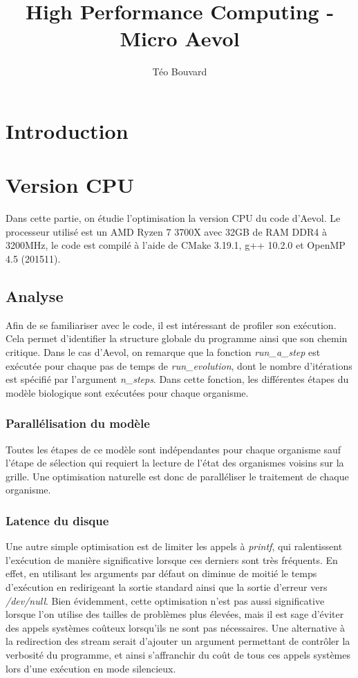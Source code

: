 \documentclass[a4paper, 10pt, twoside]{article}
\begin{document}
\title{High Performance Computing - Micro Aevol}
\author{T\'eo Bouvard}
\maketitle

\section{Introduction}

\section{Version CPU}

Dans cette partie, on étudie l'optimisation la version CPU du code d'Aevol. Le processeur utilisé est un AMD Ryzen 7 3700X avec 32GB de RAM DDR4 à 3200MHz, le code est compilé à l'aide de CMake 3.19.1, g++ 10.2.0 et OpenMP 4.5 (201511).

\subsection{Analyse}

Afin de se familiariser avec le code, il est intéressant de profiler son exécution. Cela permet d'identifier la structure globale du programme ainsi que son chemin critique. Dans le cas d'Aevol, on remarque que la fonction \textit{run\_a\_step} est exécutée pour chaque pas de temps de \textit{run\_evolution}, dont le nombre d'itérations est spécifié par l'argument \textit{n\_steps}.
Dans cette fonction, les différentes étapes du modèle biologique sont exécutées pour chaque organisme.

\subsubsection*{Parallélisation du modèle}

Toutes les étapes de ce modèle sont indépendantes pour chaque organisme sauf l'étape de sélection qui requiert la lecture de l'état des organismes voisins sur la grille. Une optimisation naturelle est donc de paralléliser le traitement de chaque organisme\label{parallel/orga}.

\subsubsection*{Latence du disque}

Une autre simple optimisation est de limiter les appels à \textit{printf}, qui ralentissent l'exécution de manière significative lorsque ces derniers sont très fréquents. En effet, en utilisant les arguments par défaut on diminue de moitié le temps d'exécution en redirigeant la sortie standard ainsi que la sortie d'erreur vers \textit{/dev/null}. Bien évidemment, cette optimisation n'est pas aussi significative lorsque l'on utilise des tailles de problèmes plus élevées, mais il est sage d'éviter des appels systèmes coûteux lorsqu'ils ne sont pas nécessaires. Une alternative à la redirection des stream serait d'ajouter un argument permettant de contrôler la verbosité du programme, et ainsi s'affranchir du coût de tous ces appels systèmes lors d'une exécution en mode silencieux.
\end{document}
